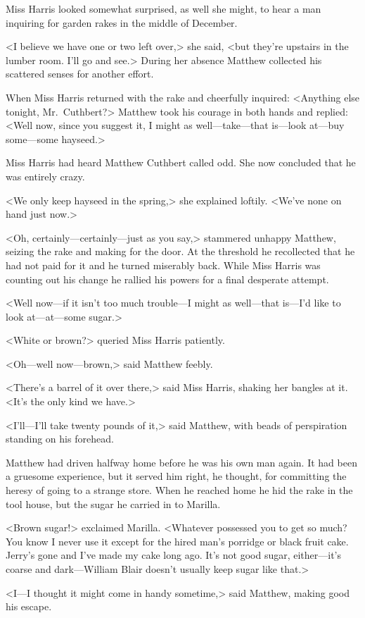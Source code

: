 Miss Harris looked somewhat surprised, as well she might, to hear a man inquiring for garden rakes in the middle of December.

<I believe we have one or two left over,> she said, <but they're upstairs in the lumber room. I'll go and see.> During her absence Matthew collected his scattered senses for another effort.

When Miss Harris returned with the rake and cheerfully inquired: <Anything else tonight, Mr.~Cuthbert?> Matthew took his courage in both hands and replied: <Well now, since you suggest it, I might as well—take—that is—look at—buy some—some hayseed.>

Miss Harris had heard Matthew Cuthbert called odd. She now concluded that he was entirely crazy.

<We only keep hayseed in the spring,> she explained loftily. <We've none on hand just now.>

<Oh, certainly—certainly—just as you say,> stammered unhappy Matthew, seizing the rake and making for the door. At the threshold he recollected that he had not paid for it and he turned miserably back. While Miss Harris was counting out his change he rallied his powers for a final desperate attempt.

<Well now—if it isn't too much trouble—I might as well—that is—I'd like to look at—at—some sugar.>

<White or brown?> queried Miss Harris patiently.

<Oh—well now—brown,> said Matthew feebly.

<There's a barrel of it over there,> said Miss Harris, shaking her bangles at it. <It's the only kind we have.>

<I'll—I'll take twenty pounds of it,> said Matthew, with beads of perspiration standing on his forehead.

Matthew had driven halfway home before he was his own man again. It had been a gruesome experience, but it served him right, he thought, for committing the heresy of going to a strange store. When he reached home he hid the rake in the tool house, but the sugar he carried in to Marilla.

<Brown sugar!> exclaimed Marilla. <Whatever possessed you to get so much? You know I never use it except for the hired man's porridge or black fruit cake. Jerry's gone and I've made my cake long ago. It's not good sugar, either—it's coarse and dark—William Blair doesn't usually keep sugar like that.>

<I—I thought it might come in handy sometime,> said Matthew, making good his escape.

